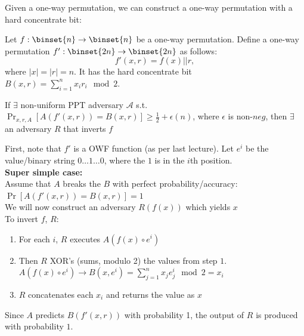 \documentclass[12pt]{tufte-book}
\newcommand{\ma}{\mathcal{A}}
\begin{document}
\bigskip
Given a one-way permutation, we can construct a one-way permutation with a hard concentrate bit:
\begin{theorem}
Let  $f:\binset{n} \rightarrow \binset{n}$ be a one-way permutation.
Define a one-way permutation $f':\binset{2n} \rightarrow \binset{2n}$ as follows:
$$f'(x,r) = f(x) || r,$$
where $|x| = |r| =n$. It has the hard concentrate bit $B(x, r) = \sum_{i=1}^n x_i r_i\mod 2$.
\end{theorem}
\proof
{}
If $\exists$ non-uniform PPT adversary $\ma$ s.t. $\Pr_{x,r,A}[A(f'(x,r)) = B(x,r)] \ge \frac{1}{2} + \epsilon(n)$, where $\epsilon$ is non-$neg$, then $\exists$ an adversary $R$ that inverts $f$

	First, note that $f'$ is a OWF function (as per last lecture).  Let $e^i$ be the value/binary string $0\ldots1\ldots0$, where the $1$ is in the $i$th position.\\

\textbf{Super simple case:}\\
	Assume that $A$ breaks the $B$ with perfect probability/accuracy: $\Pr[A(f'(x,r)) = B(x,r)] = 1$\\
	We will now construct an adversary $R(f(x))$ which yields $x$\\
	To invert $f$, $R$:
	\begin{enumerate}
		\item For each $i$, $R$ executes $A(f(x) \circ e^i)$
		\item Then $R$ XOR's (sums, modulo 2) the values from step $1$.  $A(f(x) \circ e^i) \rightarrow B(x, e^i) = \sum_{j=1}^n x_j e_j^i \mod 2  = x_i$
		\item $R$ concatenates each $x_i$ and returns the value as $x$
	\end{enumerate}
	Since $A$ predicts $B(f'(x,r))$ with probability 1, the output of $R$ is produced with probability $1$.\\
\end{document}
